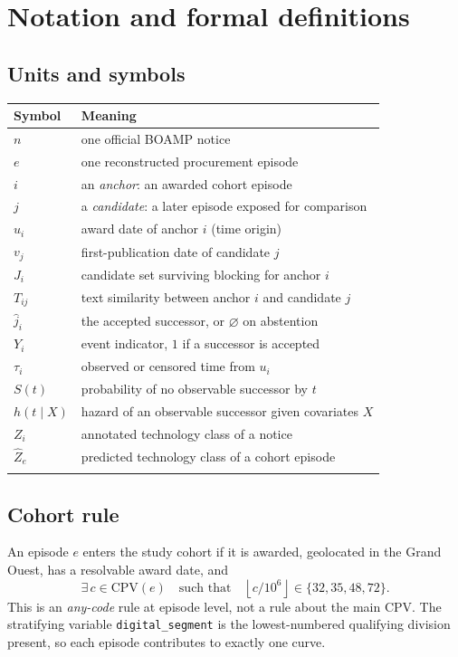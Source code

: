 \section{Notation and formal definitions}
\label{app:notation}

\subsection*{Units and symbols}

\begin{longtable}[]{@{}ll@{}}
\toprule\noalign{}
Symbol & Meaning \\
\midrule\noalign{}
\endhead
$n$ & one official BOAMP notice \\
$e$ & one reconstructed procurement episode \\
$i$ & an \emph{anchor}: an awarded cohort episode \\
$j$ & a \emph{candidate}: a later episode exposed for comparison \\
$u_i$ & award date of anchor $i$ (time origin) \\
$v_j$ & first-publication date of candidate $j$ \\
$J_i$ & candidate set surviving blocking for anchor $i$ \\
$T_{ij}$ & text similarity between anchor $i$ and candidate $j$ \\
$\hat{j}_i$ & the accepted successor, or $\varnothing$ on abstention \\
$Y_i$ & event indicator, $1$ if a successor is accepted \\
$\tau_i$ & observed or censored time from $u_i$ \\
$S(t)$ & probability of no observable successor by $t$ \\
$h(t\mid X)$ & hazard of an observable successor given covariates $X$ \\
$Z_i$ & annotated technology class of a notice \\
$\hat{Z}_e$ & predicted technology class of a cohort episode \\
\bottomrule\noalign{}
\end{longtable}

\subsection*{Cohort rule}

An episode $e$ enters the study cohort if it is awarded, geolocated in the Grand Ouest, has a resolvable
award date, and
\[
\exists\, c \in \mathrm{CPV}(e) \quad\text{such that}\quad \left\lfloor c/10^{6} \right\rfloor \in \{32,35,48,72\}.
\]
This is an \emph{any-code} rule at episode level, not a rule about the main CPV. The stratifying variable
\texttt{digital\_segment} is the lowest-numbered qualifying division present, so each episode contributes to
exactly one curve.

